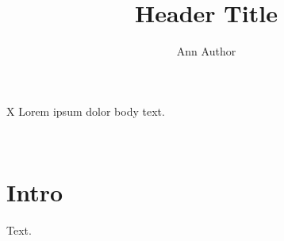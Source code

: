 \documentclass{article}
\title{Header Title}\author{Ann Author}
\begin{document}
\noindent\vbox{\vbox{\hbox{X}}} Lorem ipsum dolor body text.

\begin{center}{\Large\@title}\\[1em]\@author\end{center}
\section{Intro}
Text.
\end{document}
